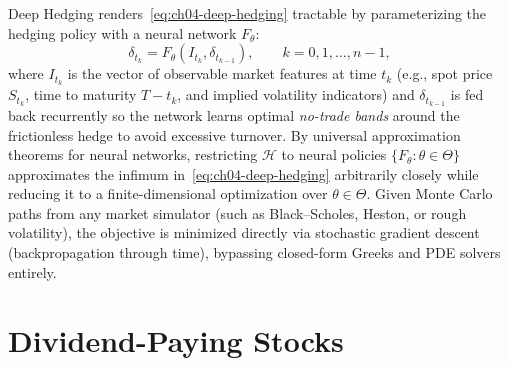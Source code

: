 Deep Hedging renders~\eqref{eq:ch04-deep-hedging} tractable by parameterizing the hedging policy with a neural network $F_\theta$:
\[
    \delta_{t_k} = F_\theta(I_{t_k}, \delta_{t_{k-1}}), \qquad k = 0, 1, \dots, n - 1,
\]
where $I_{t_k}$ is the vector of observable market features at time $t_k$ (e.g., spot price $S_{t_k}$, time to maturity $T - t_k$, and implied volatility indicators) and $\delta_{t_{k-1}}$ is fed back recurrently so the network learns optimal \emph{no-trade bands} around the frictionless hedge to avoid excessive turnover. By universal approximation theorems for neural networks, restricting $\mathcal{H}$ to neural policies $\{F_\theta : \theta \in \Theta\}$ approximates the infimum in~\eqref{eq:ch04-deep-hedging} arbitrarily closely while reducing it to a finite-dimensional optimization over $\theta \in \Theta$. Given Monte Carlo paths from any market simulator (such as Black--Scholes, Heston, or rough volatility), the objective is minimized directly via stochastic gradient descent (backpropagation through time), bypassing closed-form Greeks and PDE solvers entirely.

\section{Dividend-Paying Stocks}
\label{sec:ch04-dividends}

